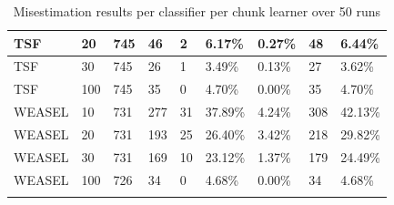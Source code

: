 \begin{landscape}
\begin{table}[hp!]
\begin{tabularx}{\hsize}{|X|X|X|X|X|X|X|X|X|}
    TSF     & 20 & 745 & 46 & 2 & 6.17\% & 0.27\% & 48 & 6.44\% \\ \hline
    TSF     & 30 & 745 & 26 & 1 & 3.49\% & 0.13\% & 27 & 3.62\% \\ \hline
    TSF     & 100 & 745 & 35 & 0 & 4.70\% & 0.00\% & 35 & 4.70\% \\ \hline
    WEASEL  & 10 & 731 & 277 & 31 & 37.89\% & 4.24\% & 308 & 42.13\% \\ \hline
    WEASEL  & 20 & 731 & 193 & 25 & 26.40\% & 3.42\% & 218 & 29.82\% \\ \hline
    WEASEL  & 30 & 731 & 169 & 10 & 23.12\% & 1.37\% & 179 & 24.49\% \\ \hline
    WEASEL  & 100 & 726 & 34 & 0 & 4.68\% & 0.00\% & 34 & 4.68\% \\ \hline
    \caption{Misestimation results per classifier per chunk learner over 50 runs}
    \label{TableClassifierMisestimation}
  \end{tabularx}
  \end{table}
\end{landscape}